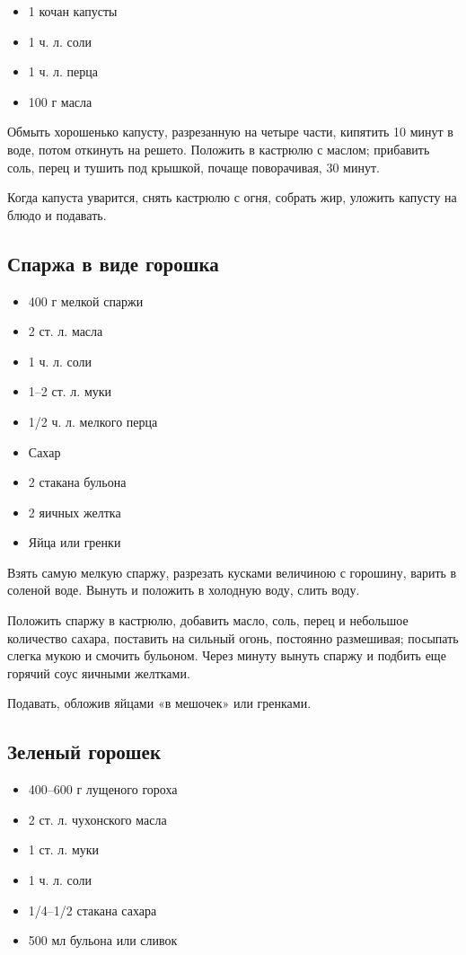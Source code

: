 \begin{itemize}
	\item 1 кочан капусты 
    \item 1 ч. л. соли 
    \item 1 ч. л. перца 
    \item 100 г масла
\end{itemize}

Обмыть хорошенько капусту, разрезанную на четыре части, кипятить 10 минут в воде, потом откинуть на решето. Положить в кастрюлю с маслом; прибавить соль, перец и тушить под крышкой, почаще поворачивая, 30 минут.

Когда капуста уварится, снять кастрюлю с огня, собрать жир, уложить капусту на блюдо и подавать.

\subsection{Спаржа в виде горошка}

\begin{itemize}
	\item 400 г мелкой спаржи 
    \item 2 ст. л. масла 
    \item 1 ч. л. соли 
    \item 1–2 ст. л. муки 
    \item 1/2 ч. л. мелкого перца 
    \item Сахар 
    \item 2 стакана бульона 
    \item 2 яичных желтка 
    \item Яйца или гренки
\end{itemize}

Взять самую мелкую спаржу, разрезать кусками величиною с горошину, варить в соленой воде. Вынуть и положить в холодную воду, слить воду.

Положить спаржу в кастрюлю, добавить масло, соль, перец и небольшое количество сахара, поставить на сильный огонь, постоянно размешивая; посыпать слегка мукою и смочить бульоном. Через минуту вынуть спаржу и подбить еще горячий соус яичными желтками.

Подавать, обложив яйцами «в мешочек» или гренками.

\subsection{Зеленый горошек}

\begin{itemize}
	\item 400–600 г лущеного гороха 
    \item 2 ст. л. чухонского масла 
    \item 1 ст. л. муки 
    \item 1 ч. л. соли 
    \item 1/4–1/2 стакана сахара 
    \item 500 мл бульона или сливок
\end{itemize}

